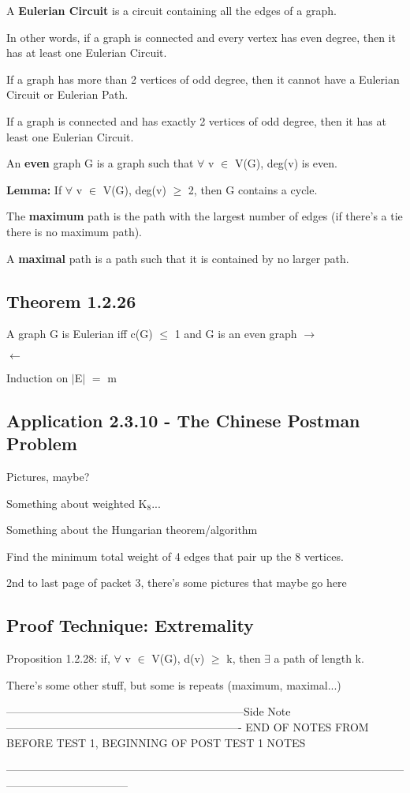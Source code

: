 \documentclass{article}
\newcommand{\mt}[1]{\ensuremath{#1}}
\newcommand\ssc[2][\DefaultOpt]{%
  \def\DefaultOpt{#2}%
  \subsection[#1]{#2}%
}
\newcommand{\sidenote}[1]{-----------------------------------------------------------------Side Note----------------------------------------------------------------
#1 \

---------------------------------------------------------------------------------------------------------------------------------------------}
\newcommand{\fa}{\mt{\forall} }          %
\newcommand{\mem}{\mt{\in} }
\newcommand{\exs}{\mt{\exists} }
\newcommand{\lra}{ \mt{\longrightarrow} } %
\newcommand{\lla}{ \mt{\longleftarrow} }  %
\newcommand{\av}[1]{\mt{|}#1\mt{|}}  %
\newcommand{\lse}{\mt{\operatorname{\leq}} }
\newcommand{\gre}{\mt{\operatorname{\geq}} }
\newcommand{\eql}{ \mt{\operatorname{=}} }
\newcommand{\uw}[2]{#1\mt{_{#2}}}
\begin{document}
{{A \textbf{Eulerian Circuit} is a circuit containing all the edges of a graph.

In other words, if a graph is connected and every vertex has even degree, then it has at least one Eulerian Circuit. 

If a graph has more than 2 vertices of odd degree, then it cannot have a Eulerian Circuit or Eulerian Path.

If a graph is connected and has exactly 2 vertices of odd degree, then it has at least one Eulerian Circuit.

}

An \textbf{even} graph G is a graph such that \fa v \mem V(G), deg(v) is even.

\textbf{Lemma:} If \fa v \mem V(G), deg(v) \gre 2, then G contains a cycle.

The \textbf{maximum} path is the path with the largest number of edges (if there's a tie there is no maximum path).

A \textbf{maximal} path is a path such that it is contained by no larger path.

\ssc{Theorem 1.2.26}{

A graph G is Eulerian iff c(G) \lse 1 and G is an even graph
\lra 


\lla 

Induction on \av{E} \eql m

}

\ssc{Application 2.3.10 - The Chinese Postman Problem}{

Pictures, maybe?

Something about weighted \uw{K}{8}...

Something about the Hungarian theorem/algorithm

Find the minimum total weight of 4 edges that pair up the 8 vertices.

2nd to last page of packet 3, there's some pictures that maybe go here

}

\ssc{Proof Technique: Extremality}{

Proposition 1.2.28: if, \fa v \mem V(G), d(v) \gre k, then \exs a path of length k.

There's some other stuff, but some is repeats (maximum, maximal...)

}



}

\newpage

\sidenote{END OF NOTES FROM BEFORE TEST 1, BEGINNING OF POST TEST 1 NOTES}
\end{document}
